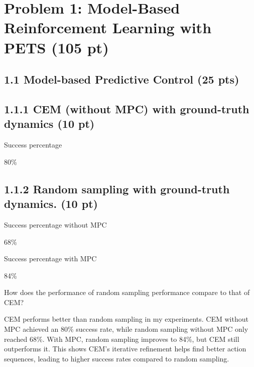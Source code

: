 \documentclass[12pt]{article}
\begin{document}
\newpage
\section*{Problem 1: Model-Based Reinforcement Learning with PETS (105 pt)}
\subsection*{1.1 Model-based Predictive Control (25 pts)}

\subsection*{1.1.1 CEM (without MPC) with ground-truth dynamics (10 pt)}

Success percentage
\begin{tcolorbox}[fit,height=1cm, width=5cm, blank, borderline={1pt}{1pt},nobeforeafter, valign=center]
\begin{center}
    \large{80\%}
\end{center}
\end{tcolorbox}

\subsection*{1.1.2 Random sampling with ground-truth dynamics. (10 pt)}

Success percentage without MPC 
\begin{tcolorbox}[fit,height=1cm, width=5cm, blank, borderline={1pt}{1pt},nobeforeafter, valign=center]
\begin{center}
    \large{68\%}
\end{center}
\end{tcolorbox}

Success percentage with MPC 
\begin{tcolorbox}[fit,height=1cm, width=5cm, blank, borderline={1pt}{1pt},nobeforeafter, valign=center]
\begin{center}
    \large{84\%}
\end{center}
\end{tcolorbox}

How does the performance of random sampling performance compare to that of CEM?
\begin{tcolorbox}[fit,height=5em, width=40em, blank, borderline={1pt}{1pt},nobeforeafter, valign=center]
\begin{center}
CEM performs better than random sampling in my experiments. CEM without MPC achieved an 80\% success rate, while random sampling without MPC only reached 68\%. With MPC, random sampling improves to 84\%, but CEM still outperforms it. This shows CEM’s iterative refinement helps find better action sequences, leading to higher success rates compared to random sampling.
\end{center} 
\end{tcolorbox}
\end{document}

